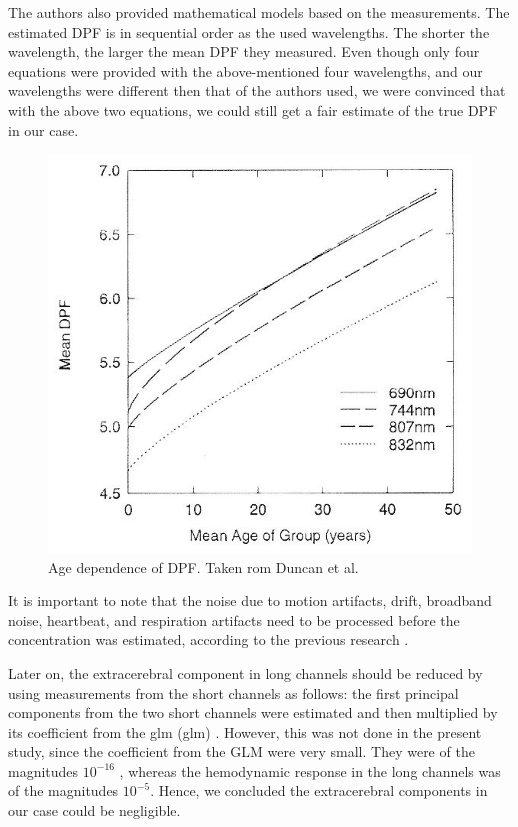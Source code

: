 The authors also provided mathematical models based on the measurements. The estimated DPF is in sequential order as the used wavelengths. The shorter the wavelength, the larger the mean DPF they measured. Even though only four equations were provided with the above-mentioned four wavelengths, and our wavelengths were different then that of the authors used, we were convinced that with the above two equations, we could still get a fair estimate of the true DPF in our case.

\begin{figure}[H]
  \centering
    \includegraphics[scale=.45]{bilder/fig3_duncan.jpg}
  \caption{Age dependence of DPF. Taken rom Duncan et al. \citeyearpar{Duncan1996MeasurementOC} }
  \label{fig:somesignal}
\end{figure}

It is important to note that the noise due to motion artifacts, drift, broadband noise, heartbeat, and respiration artifacts need to be processed before the concentration was estimated, according to the previous research \citep {Huppert:09}.

Later on, the extracerebral component in long channels should be reduced by using measurements from the short channels as follows: the first principal components from the two short channels were estimated and then multiplied by its coefficient from the \acrlong{glm} (\acrshort {glm}) \citep{friston1994statistical}. However, this was not done in the present study, since the coefficient from the GLM were very small. They were of the magnitudes $10^{-16}$ , whereas the hemodynamic response in the long channels was of the magnitudes $10^{-5}$. Hence, we concluded the extracerebral components in our case could be negligible.

